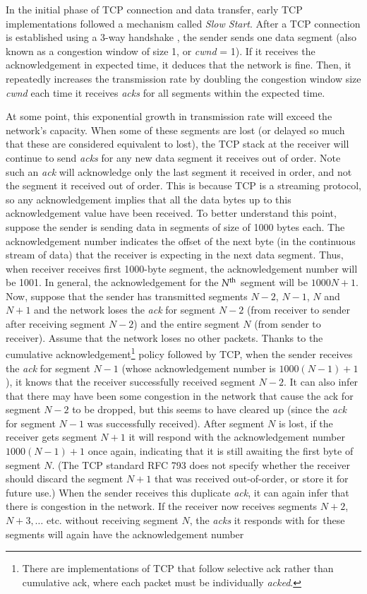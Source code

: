 \begin{multicols}{2}
In the initial phase of TCP connection and data transfer, early TCP implementations followed a mechanism called \textit{Slow Start}. After a TCP connection is established using a 3-way handshake  \cite{art2-key02}, the sender sends one data segment (also known as a congestion window of size 1, or \textit{cwnd} = 1). If it receives the acknowledgement in expected time, it deduces that the network is fine. Then, it repeatedly increases the transmission rate by doubling the congestion window size \textit{cwnd} each time it receives \textit{acks} for all segments within the expected time.

At some point, this exponential growth in transmission rate will exceed the network’s capacity. When some of these segments are lost (or delayed so much that these are considered equivalent to lost), the TCP stack at the receiver will continue to send \textit{acks} for any new data segment it receives out of order. Note such an \textit{ack} will acknowledge only the last segment it received in order, and not the segment it received out of order. This is because TCP is a streaming protocol, so any acknowledgement implies that all the data bytes up to this acknowledgement value have been received. To better understand this point, suppose the sender is sending data in segments of size of 1000 bytes each. The acknowledgement number indicates the offset of the next byte (in the continuous stream of data) that the receiver is expecting in the next data segment. Thus, when receiver receives first 1000-byte segment, the acknowledgement number will be 1001. In general, the acknowledgement for the $N^{\rm th}$ segment will be $1000N + 1$. Now, suppose that the sender has transmitted segments $N-2$, $N-1$, $N$ and $N+1$ and the network loses the \textit{ack} for segment $N-2$ (from receiver to sender after receiving segment $N-2$) and the entire segment $N$ (from sender to receiver). Assume that the network loses no other packets. Thanks to the cumulative acknowledgement\footnote{There are implementations of TCP that follow selective ack rather than cumulative ack, where each packet must  be individually \textit{acked}.} policy followed by TCP, when the sender receives the \textit{ack} for segment $N-1$ (whose acknowledgement number is $1000(N-1) + 1$), it knows that the receiver successfully received segment $N-2$. It can also infer that there may have been some congestion in the network that cause the ack for segment $N-2$ to be dropped, but this seems to have cleared up (since the \textit{ack} for segment $N-1$ was successfully received). After segment $N$ is lost, if the receiver gets segment $N+1$ it will respond with the acknowledgement number $1000(N-1) + 1$ once again, indicating that it is still awaiting the first byte of segment $N$. (The TCP standard RFC 793 \cite{art2-key02} does not specify whether the receiver should discard the segment $N+1$ that was received out-of-order, or store it for future use.) When the sender receives this duplicate \textit{ack}, it can again infer that there is congestion in the network. If the receiver now receives segments $N+2$, $N+3, … $ etc. without receiving segment $N$, the \textit{acks} it responds with for these segments will again have the acknowledgement number 
\end{multicols}
